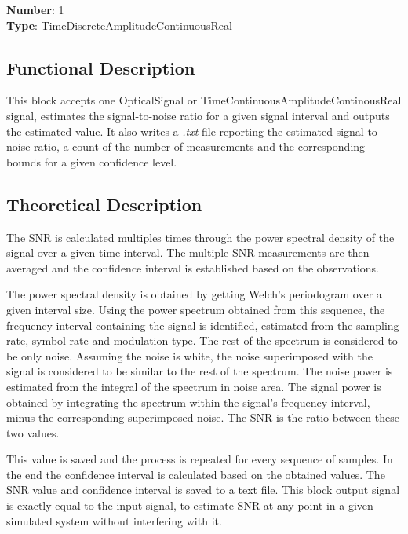 \textbf{Number}: 1\\
\textbf{Type}: TimeDiscreteAmplitudeContinuousReal

\subsection*{Functional Description}

This block accepts one OpticalSignal or TimeContinuousAmplitudeContinousReal signal, estimates the signal-to-noise ratio for a given signal interval and outputs the estimated value. It also writes a \textit{.txt} file reporting the estimated signal-to-noise ratio, a count of the number of measurements and the corresponding bounds for a given confidence level.

\subsection*{Theoretical Description}\label{snrcalc}
The SNR is calculated multiples times through the power spectral density of the signal over a given time interval. The multiple SNR measurements are then averaged and the confidence interval is established based on the observations.

The power spectral density is obtained by getting Welch's periodogram over a given interval size. Using the power spectrum obtained from this sequence, the frequency interval containing the signal is identified, estimated from the sampling rate, symbol rate and modulation type. The rest of the spectrum is considered to be only noise.
Assuming the noise is white, the noise superimposed with the signal is considered to be similar to the rest of the spectrum. The noise power is estimated from the integral of the spectrum in noise area. The signal power is obtained by integrating the spectrum within the signal's frequency interval, minus the corresponding superimposed noise. The SNR is the ratio between these two values. 

This value is saved and the process is repeated for every sequence of samples. In the end the confidence interval is calculated based on the obtained values. The SNR value and confidence interval is saved to a text file.
This block output signal is exactly equal to the input signal, to estimate SNR at any point in a given simulated system without interfering with it.


